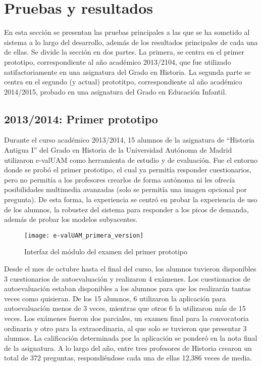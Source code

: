 \chapter{Pruebas y resultados\label{sec:pruebasYResultados}}

En esta sección se presentan las pruebas principales a las que se ha sometido al sistema a lo largo del desarrollo, además de los resultados principales de cada una de ellas. Se divide la sección en dos partes. La primera, se centra en el primer prototipo, correspondiente al año académico 2013/2104, que fue utilizado satifactoriamente en una asignatura del Grado en Historia. La segunda parte se centra en el segundo (y actual) prototitpo, correspondiente al año académico 2014/2015, probado en una asignatura del Grado en Educación Infantil.


\section{2013/2014: Primer prototipo}


Durante el curso académico 2013/2014, 15 alumnos de la asignatura de ``Historia Antigua I'' del Grado en Historia de la Universidad Autónoma de Madrid utilizaron e-valUAM como herramienta de estudio y de evaluación. Fue el entorno donde se probó el primer prototipo, el cual ya permitía responder cuestionarios, pero no permitía a los profesores crearlos de forma autónoma ni les ofrecía posibilidades multimedia avanzadas (solo se permitía una imagen opcional por pregunta). De esta forma, la experiencia se centró en probar la experiencia de uso de los alumnos, la robustez del sistema para responder a los picos de demanda, además de probar los modelos subyacentes.

\begin{figure}[htp!]
	\centering
	\texttt{[image: e-valUAM\_primera\_version]}
	\caption{Interfaz del módulo del examen del primer prototipo}
	\label{fig:e-valUAM primera version}
\end{figure}

Desde el mes de octubre hasta el final del curso, los alumnos tuvieron disponibles 3 cuestionarios de autoevaluación y realizaron 4 exámenes. Los cuestionarios de autoevaluación estaban disponibles a los alumnos para que los realizarán tantas veces como quisieran. De los 15 alumnos, 6 utilizaron la aplicación para autoevaluación menos de 3 veces, mientras que otros 6 la utilizaron más de 15 veces. Los exámenes fueron dos parciales, un examen final para la convocatoria ordinaria y otro para la extraordinaria, al que solo se tuvieron que presentar 3 alumnos. La calificación determinada por la aplicación se ponderó en la nota final de la asignatura. A lo largo del año, entre tres profesores de Historia crearon un total de 372 preguntas, respondiéndose cada una de ellas 12,386 veces de media. 


